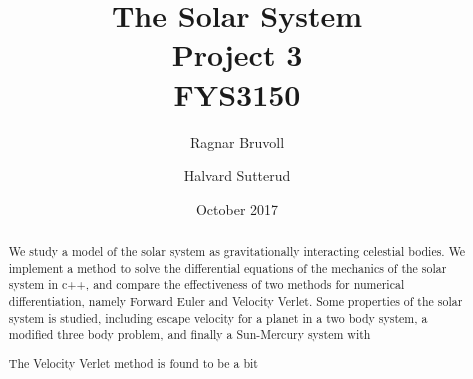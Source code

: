 \documentclass[10pt]{article}
\begin{document}
\title{The Solar System
\\ Project 3
\\ FYS3150}
\author{Ragnar Bruvoll \and Halvard Sutterud}
\date{October 2017}
\maketitle{\begin{center}\end{center}}
\thispagestyle{empty}

\begin{abstract}
    We study a model of the solar system as gravitationally interacting
    celestial bodies.  We implement a method to solve the differential
    equations of the mechanics of the solar system in c++, and compare the
    effectiveness of two methods for numerical differentiation, namely
    Forward Euler and Velocity Verlet. Some properties of the solar system
    is studied, including escape velocity for a planet in a two body
    system, a modified three body problem, and finally a Sun-Mercury system
    with 
    
    The Velocity Verlet method is found to be a bit 
\end{abstract}

\tableofcontents

\newpage
{}
\end{document}
